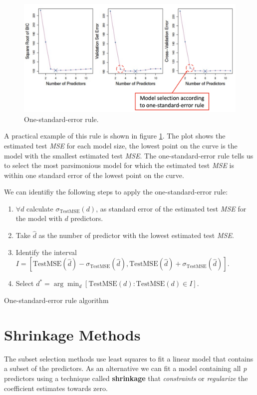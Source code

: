 \begin{figure}
    \centering
    \includegraphics[width=0.8\linewidth]{./figures/chapter_4/onestandarderror.png}
    \caption{One-standard-error rule.}
    \label{fig:lec_15_one_standard_error_rule}
\end{figure}

A practical example of this rule is shown in figure \ref{fig:lec_15_one_standard_error_rule}. The plot shows the estimated test \textit{MSE} for each model size, the lowest point on the curve is the model with the smallest estimated test \textit{MSE}. The one-standard-error rule tells us to select the most parsimonious model for which the estimated test \textit{MSE} is within one standard error of the lowest point on the curve.

We can identifiy the following steps to apply the one-standard-error rule: %
\begin{algorithm}
    \begin{enumerate}
        \item $\forall d$ calculate $\sigma_{\text{TestMSE}}(d)$, as standard error of the estimated test \textit{MSE} for the model with $d$ predictors.
        \item Take $\hat d$ as the number of predictor with the lowest estimated test \textit{MSE}.
        \item Identify the interval $I = [\text{TestMSE}(\hat d) - \sigma_{\text{TestMSE}}(\hat d), \text{TestMSE}(\hat d) + \sigma_{\text{TestMSE}}(\hat d)]$.
        \item Select $d^\ast = \arg\min_d[\text{TestMSE}(d) : \text{TestMSE}(d) \in I]$.
    \end{enumerate}
    \caption{One-standard-error rule algorithm}
\end{algorithm}
\section{Shrinkage Methods}
The subset selection methods use least squares to fit a linear model that contains a subset of the predictors. As an alternative we can fit a model containing all \textit{p} predictors using a technique called \textbf{shrinkage} that \textit{constraints} or \textit{regularize} the coefficient estimates towards zero.

